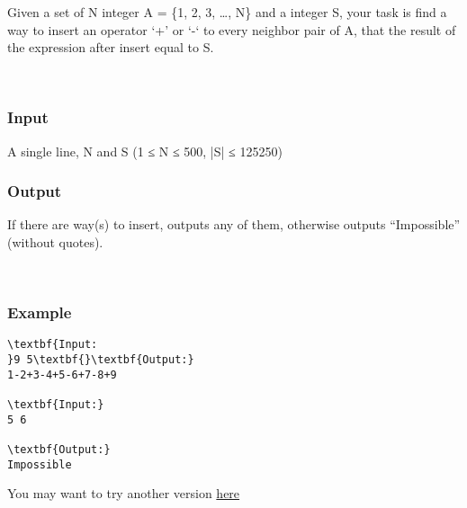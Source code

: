 

Given a set of N integer A = \{1, 2, 3, …, N\} and a integer S, your task is find a way to insert an operator ‘+’ or ‘-‘ to every neighbor pair of A, that the result of the expression after insert equal to S.

 

\subsubsection{Input}

A single line, N and S (1 ≤ N ≤ 500, |S| ≤ 125250)

\subsubsection{Output}

If there are way(s) to insert, outputs any of them, otherwise outputs “Impossible” (without quotes).

 

\subsubsection{Example}
\begin{verbatim}
\textbf{Input:
}9 5\textbf{}\textbf{Output:}
1-2+3-4+5-6+7-8+9

\textbf{Input:}
5 6

\textbf{Output:}
Impossible

\end{verbatim}

You may want to try another version \href{../../problems/BLOPER2}{here}
